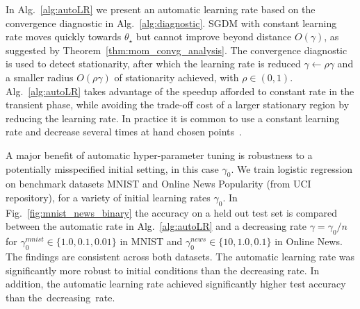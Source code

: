 \documentclass[conference]{IEEEtran}
\begin{document}
In Alg.~\ref{alg:autoLR} we present an automatic learning rate based on the convergence diagnostic in Alg.~\ref{alg:diagnostic}.
SGDM with constant learning rate moves quickly towards $\theta_\star$ but cannot improve beyond distance $O(\gamma)$, as suggested by Theorem~\ref{thm:mom_convg_analysis}.
The convergence diagnostic is used to detect stationarity, after which the learning rate is reduced $\gamma \gets \rho \gamma$ and a smaller radius $O(\rho \gamma)$ of stationarity achieved, with $\rho \in (0,1)$. Alg.~\ref{alg:autoLR} takes advantage of the speedup afforded to constant rate in the transient phase, while avoiding the trade-off cost of a larger stationary region by reducing the learning rate. In practice it is common to use a constant learning rate and decrease several times at hand chosen points~\cite{Proc:He_CVPR16,Article:Krizhevsky_CACM17}.


A major benefit of automatic hyper-parameter tuning is robustness to a potentially misspecified initial setting, in this case $\gamma_0$. We train logistic regression on benchmark datasets
 MNIST and Online News Popularity (from UCI repository), 
for a variety of initial learning rates $\gamma_0$.
In Fig.~\ref{fig:mnist_news_binary} the accuracy on a held out test set is compared between the automatic rate in Alg.~\ref{alg:autoLR} and a decreasing rate $\gamma = \gamma_0 / n$ for $\gamma_0^{mnist} \in \{1.0, 0.1, 0.01\}$ in MNIST and $\gamma_0^{news} \in \{10, 1.0, 0.1\}$ in Online News.
The findings are consistent across both datasets.
The automatic learning rate was significantly more robust to initial conditions than the decreasing rate. In addition, the automatic learning rate achieved significantly higher test accuracy than the~decreasing~rate.
\end{document}
